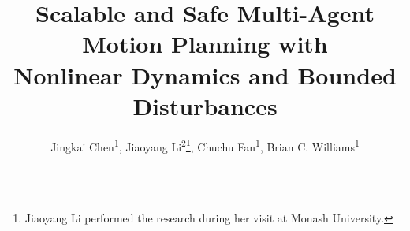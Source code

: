 \documentclass[letterpaper]{article} %
\theoremstyle{definition}
\begin{document}
\title{Scalable and Safe Multi-Agent Motion Planning with \\ Nonlinear Dynamics and Bounded Disturbances}

\author{
    Jingkai Chen\textsuperscript{\rm 1}, 
    Jiaoyang Li\textsuperscript{\rm 2}\protect\thanks{Jiaoyang Li performed the research during her visit at Monash University.}, 
    Chuchu Fan\textsuperscript{\rm 1}, 
    Brian C. Williams\textsuperscript{\rm 1}
    \\
}
\maketitle

\end{document}
